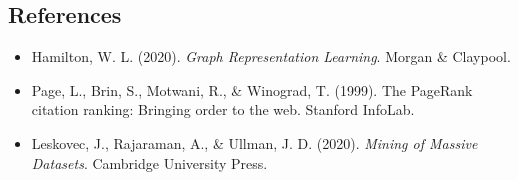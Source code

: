 \begin{notechapter}
\section{References}

\begin{itemize}
    \item Hamilton, W. L. (2020). \emph{Graph Representation Learning}. Morgan \& Claypool.
    \item Page, L., Brin, S., Motwani, R., \& Winograd, T. (1999). The PageRank citation ranking: Bringing order to the web. Stanford InfoLab.
    \item Leskovec, J., Rajaraman, A., \& Ullman, J. D. (2020). \emph{Mining of Massive Datasets}. Cambridge University Press.
\end{itemize}
\end{notechapter}
